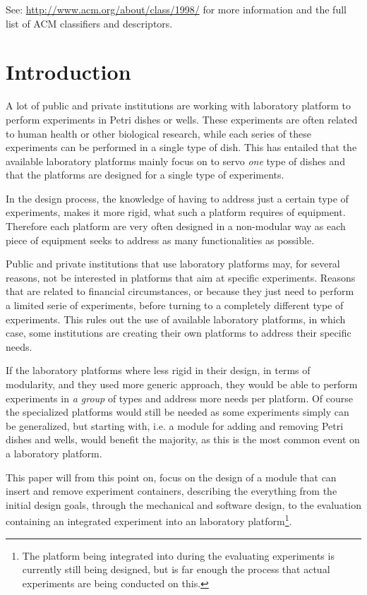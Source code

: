 \documentclass{sigchi}
\begin{document}
	See: \url{http://www.acm.org/about/class/1998/}
	for more information and the full list of ACM classifiers
	and descriptors. \newline
	
	\section{Introduction}
	A lot of public and private institutions are working with laboratory platform to perform experiments in Petri dishes or wells. These experiments are often related to human health or other biological research, while each series of these experiments can be performed in a single type of dish. This has entailed that the available laboratory platforms mainly focus on to servo \textit{one} type of dishes and that the platforms are designed for a single type of experiments. 
	
	In the design process, the knowledge of having to address just a certain type of experiments, makes it more rigid, what such a platform requires of equipment. Therefore each platform are very often designed in a non-modular way as each piece of equipment seeks to address as many functionalities as possible.
	
	Public and private institutions that use laboratory platforms may, for several reasons, not be interested in platforms that aim at specific experiments. Reasons that are related to financial circumstances, or because they just need to perform a limited serie of experiments, before turning to a completely different type of experiments. This rules out the use of available laboratory platforms, in which case, some institutions are creating their own platforms to address their specific needs.
	
	If the laboratory platforms where less rigid in their design, in terms of modularity, and they used more generic approach, they would be able to perform experiments in \textit{a group} of types and address more needs per platform. Of course the specialized platforms would still be needed as some experiments simply can be generalized, but starting with, i.e. a module for adding and removing Petri dishes and wells, would benefit the majority, as this is the most common event on a laboratory platform.
	
	This paper will from this point on, focus on the design of a module that can insert and remove experiment containers, describing the everything from the initial design goals, through  the mechanical and software design, to the evaluation containing an integrated experiment into an laboratory platform\footnote{The platform being integrated into during the evaluating experiments is currently still being designed, but is far enough the process that actual experiments are being conducted on this.}.
	
\end{document}
